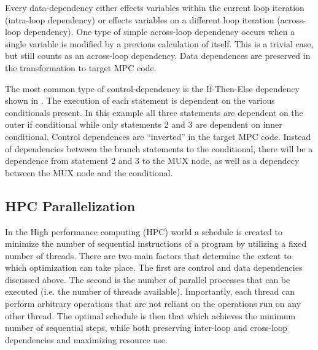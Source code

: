 Every data-dependency either effects variables within the current loop iteration
(intra-loop dependency) or effects variables on a different loop iteration
(across-loop dependency). One type of simple across-loop dependency occurs when a single
variable is modified by a previous calculation of itself. This is a trivial case,
but still counts as an across-loop dependency. Data dependences are preserved in the 
transformation to target MPC code. 


The most common type of control-dependency is the If-Then-Else dependency shown
in . The execution of each statement is dependent on the various conditionals 
present. In this example all three statements are dependent on the outer if conditional while only
statements 2 and 3 are dependent on inner conditional. Control dependences 
are ``inverted'' in the target MPC code. Instead of dependencies between the branch statements
to the conditional, there will be a dependence from statement 2 and 3 to the MUX 
node, as well as a dependecy between the MUX node and the conditional. 

\subsection{HPC Parallelization}
\label{sec:hpcparallelization}

In the High performance computing (HPC) world a schedule is created to minimize the number
of sequential instructions of a program by utilizing a fixed number of threads. There 
are two main factors that determine the extent to which optimization can take place.
The first are control and data dependencies discussed above. The second is the number
of parallel processes that can be executed (i.e. the number of threads available). 
Importantly, each thread can perform arbitrary operations that are not reliant on the operations 
run on any other thread. The optimal schedule is then that which achieves the minimum number 
of sequential steps, while both preserving inter-loop and cross-loop dependencies 
and maximizing resource use. 


